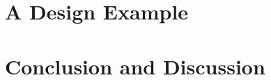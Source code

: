 \documentclass[preprint,12pt,authoryear]{elsarticle}
\begin{document}
\section{A Design Example}

\section{Conclusion and Discussion}





\begin{thebibliography}{00}


\bibitem[ ()]{}

\end{thebibliography}
\end{document}
